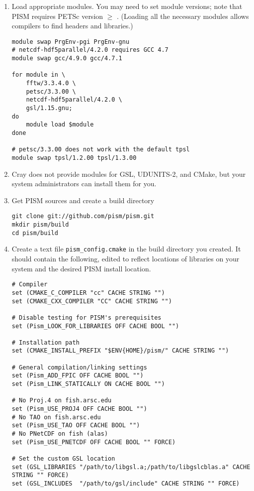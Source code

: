 \documentclass[titlepage,letterpaper,final]{scrartcl}
\begin{document}
\begin{enumerate}
\item Load appropriate modules. You may need to set module versions; note that
  PISM requires PETSc version $\ge$ \PETSCREL. (Loading all the necessary
  modules allows compilers to find headers and libraries.)
\begin{verbatim}
module swap PrgEnv-pgi PrgEnv-gnu
# netcdf-hdf5parallel/4.2.0 requires GCC 4.7
module swap gcc/4.9.0 gcc/4.7.1

for module in \
    fftw/3.3.4.0 \
    petsc/3.3.00 \
    netcdf-hdf5parallel/4.2.0 \
    gsl/1.15.gnu;
do
    module load $module
done

# petsc/3.3.00 does not work with the default tpsl
module swap tpsl/1.2.00 tpsl/1.3.00
\end{verbatim}
\item Cray does not provide modules for GSL, UDUNITS-2, and CMake, but your system administrators can install them for you.
\item Get PISM sources and create a build directory
\begin{verbatim}
git clone git://github.com/pism/pism.git
mkdir pism/build
cd pism/build
\end{verbatim}
\item Create a text file \texttt{pism_config.cmake} in the build
  directory you created. It should contain the following, edited to
  reflect locations of libraries on your system and the desired PISM
  install location.

\begin{verbatim}
# Compiler
set (CMAKE_C_COMPILER "cc" CACHE STRING "")
set (CMAKE_CXX_COMPILER "CC" CACHE STRING "")

# Disable testing for PISM's prerequisites
set (Pism_LOOK_FOR_LIBRARIES OFF CACHE BOOL "")

# Installation path
set (CMAKE_INSTALL_PREFIX "$ENV{HOME}/pism/" CACHE STRING "")

# General compilation/linking settings
set (Pism_ADD_FPIC OFF CACHE BOOL "")
set (Pism_LINK_STATICALLY ON CACHE BOOL "")

# No Proj.4 on fish.arsc.edu
set (Pism_USE_PROJ4 OFF CACHE BOOL "")
# No TAO on fish.arsc.edu
set (Pism_USE_TAO OFF CACHE BOOL "")
# No PNetCDF on fish (alas)
set (Pism_USE_PNETCDF OFF CACHE BOOL "" FORCE)

# Set the custom GSL location
set (GSL_LIBRARIES "/path/to/libgsl.a;/path/to/libgslcblas.a" CACHE STRING "" FORCE)
set (GSL_INCLUDES  "/path/to/gsl/include" CACHE STRING "" FORCE)


\end{verbatim}
\end{enumerate}
\end{document}
